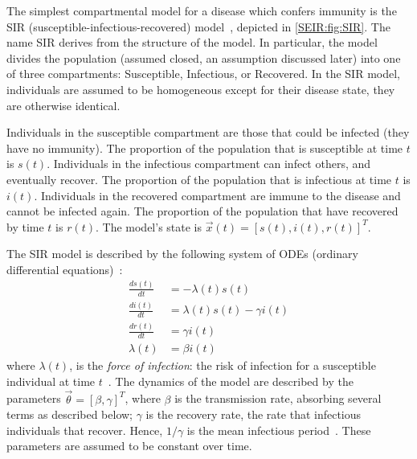 \documentclass[thesis.tex]{subfiles}
\begin{document}
The simplest compartmental model for a disease which confers immunity is the SIR (susceptible-infectious-recovered) model~\autocite[15]{keelingModeling}, depicted in \cref{SEIR:fig:SIR}.
The name SIR derives from the structure of the model.
In particular, the model divides the population (assumed closed, an assumption discussed later) into one of three compartments: Susceptible, Infectious, or Recovered.
In the SIR model, individuals are assumed to be homogeneous except for their disease state, \ie they are otherwise identical.

Individuals in the susceptible compartment are those that could be infected (they have no immunity).
The proportion of the population that is susceptible at time $t$ is $s(t)$.
Individuals in the infectious compartment can infect others, and eventually recover.
The proportion of the population that is infectious at time $t$ is $i(t)$.
Individuals in the recovered compartment are immune to the disease and cannot be infected again.
The proportion of the population that have recovered by time $t$ is $r(t)$.
The model's state is $\vec{x}(t) = [s(t), i(t), r(t)]^T$.

The SIR model is described by the following system of ODEs (ordinary differential equations)~\autocite[19]{keelingModeling}:
\begin{align}
\frac{ds(t)}{dt} &= -\lambda(t) s(t) \\
\frac{di(t)}{dt} &= \lambda(t) s(t) - \gamma i(t) \\
\frac{dr(t)}{dt} &= \gamma i(t) \\
\lambda(t) &= \beta i(t)
\end{align}
where $\lambda(t)$, is the \emph{force of infection}: the risk of infection for a susceptible individual at time $t$~\autocite[17]{keelingModeling}.
The dynamics of the model are described by the parameters $\vec{\theta} = [\beta, \gamma]^T$, where
$\beta$ is the transmission rate, absorbing several terms as described below;
$\gamma$ is the recovery rate, the rate that infectious individuals that recover.
Hence, $1/\gamma$ is the mean infectious period~\autocite[367]{keelingModeling}.
These parameters are assumed to be constant over time.
\end{document}
